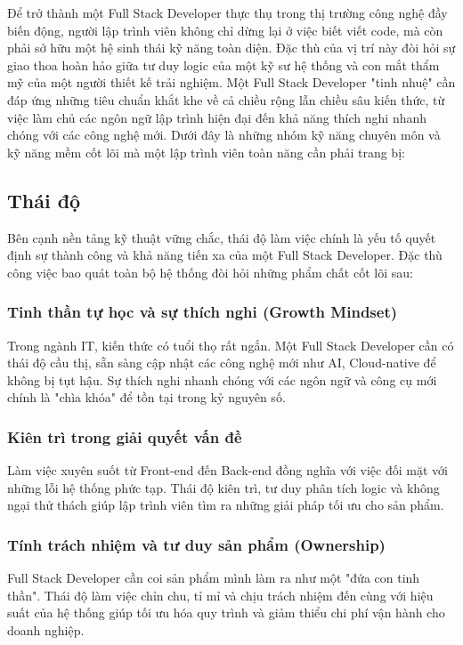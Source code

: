 \documentclass[12pt,a4paper]{article}
\begin{document}
\hspace{0.7cm}Để trở thành một Full Stack Developer thực thụ trong thị trường công nghệ đầy biến động, người lập trình viên không chỉ dừng lại ở việc biết viết code, mà còn phải sở hữu một hệ sinh thái kỹ năng toàn diện. Đặc thù của vị trí này đòi hỏi sự giao thoa hoàn hảo giữa tư duy logic của một kỹ sư hệ thống và con mắt thẩm mỹ của một người thiết kế trải nghiệm. Một Full Stack Developer "tinh nhuệ" cần đáp ứng những tiêu chuẩn khắt khe về cả chiều rộng lẫn chiều sâu kiến thức, từ việc làm chủ các ngôn ngữ lập trình hiện đại đến khả năng thích nghi nhanh chóng với các công nghệ mới. Dưới đây là những nhóm kỹ năng chuyên môn và kỹ năng mềm cốt lõi mà một lập trình viên toàn năng cần phải trang bị:

\subsection{Thái độ}

\hspace{0.7cm}Bên cạnh nền tảng kỹ thuật vững chắc, thái độ làm việc chính là yếu tố quyết định sự thành công và khả năng tiến xa của một Full Stack Developer. Đặc thù công việc bao quát toàn bộ hệ thống đòi hỏi những phẩm chất cốt lõi sau:
\subsubsection{Tinh thần tự học và sự thích nghi (Growth Mindset)}
\hspace{0.7cm}Trong ngành IT, kiến thức có tuổi thọ rất ngắn. Một Full Stack Developer cần có thái độ cầu thị, sẵn sàng cập nhật các công nghệ mới như AI, Cloud-native để không bị tụt hậu. Sự thích nghi nhanh chóng với các ngôn ngữ và công cụ mới chính là "chìa khóa" để tồn tại trong kỷ nguyên số.

\subsubsection{Kiên trì trong giải quyết vấn đề}
\hspace{0.7cm}Làm việc xuyên suốt từ Front-end đến Back-end đồng nghĩa với việc đối mặt với những lỗi hệ thống phức tạp. Thái độ kiên trì, tư duy phân tích logic và không ngại thử thách giúp lập trình viên tìm ra những giải pháp tối ưu cho sản phẩm.

\subsubsection{Tính trách nhiệm và tư duy sản phẩm (Ownership)}
\hspace{0.7cm}Full Stack Developer cần coi sản phẩm mình làm ra như một "đứa con tinh thần". Thái độ làm việc chỉn chu, tỉ mỉ và chịu trách nhiệm đến cùng với hiệu suất của hệ thống giúp tối ưu hóa quy trình và giảm thiểu chi phí vận hành cho doanh nghiệp.
\end{document}
